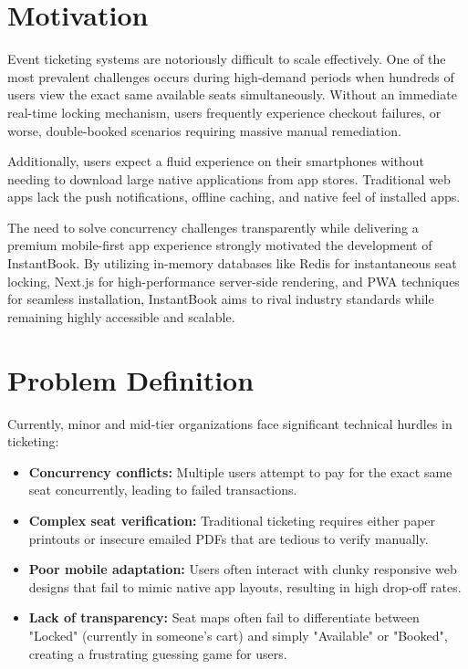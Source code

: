 \documentclass[12pt,a4paper]{report}
\begin{document}
\section{Motivation}
Event ticketing systems are notoriously difficult to scale effectively. One of the most prevalent challenges occurs during high-demand periods when hundreds of users view the exact same available seats simultaneously. Without an immediate real-time locking mechanism, users frequently experience checkout failures, or worse, double-booked scenarios requiring massive manual remediation. 

Additionally, users expect a fluid experience on their smartphones without needing to download large native applications from app stores. Traditional web apps lack the push notifications, offline caching, and native feel of installed apps.

The need to solve concurrency challenges transparently while delivering a premium mobile-first app experience strongly motivated the development of InstantBook. By utilizing in-memory databases like Redis for instantaneous seat locking, Next.js for high-performance server-side rendering, and PWA techniques for seamless installation, InstantBook aims to rival industry standards while remaining highly accessible and scalable.

\section{Problem Definition}
Currently, minor and mid-tier organizations face significant technical hurdles in ticketing:
\begin{itemize}
    \item \textbf{Concurrency conflicts:} Multiple users attempt to pay for the exact same seat concurrently, leading to failed transactions.
    \item \textbf{Complex seat verification:} Traditional ticketing requires either paper printouts or insecure emailed PDFs that are tedious to verify manually.
    \item \textbf{Poor mobile adaptation:} Users often interact with clunky responsive web designs that fail to mimic native app layouts, resulting in high drop-off rates.
    \item \textbf{Lack of transparency:} Seat maps often fail to differentiate between "Locked" (currently in someone's cart) and simply "Available" or "Booked", creating a frustrating guessing game for users.
\end{itemize}
\end{document}
